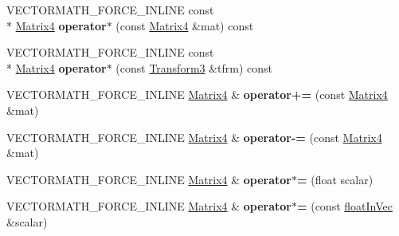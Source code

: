 \begin{DoxyCompactItemize}
\item 
\hypertarget{class_vectormath_1_1_aos_1_1_matrix4_a24d39c34c5cd2ddceef0a2b184d87e52}{V\+E\+C\+T\+O\+R\+M\+A\+T\+H\+\_\+\+F\+O\+R\+C\+E\+\_\+\+I\+N\+L\+I\+N\+E const \\*
\hyperlink{class_vectormath_1_1_aos_1_1_matrix4}{Matrix4} {\bfseries operator$\ast$} (const \hyperlink{class_vectormath_1_1_aos_1_1_matrix4}{Matrix4} \&mat) const }\label{class_vectormath_1_1_aos_1_1_matrix4_a24d39c34c5cd2ddceef0a2b184d87e52}

\item 
\hypertarget{class_vectormath_1_1_aos_1_1_matrix4_ab8bc51436e2519e79a8601b2be8f863e}{V\+E\+C\+T\+O\+R\+M\+A\+T\+H\+\_\+\+F\+O\+R\+C\+E\+\_\+\+I\+N\+L\+I\+N\+E const \\*
\hyperlink{class_vectormath_1_1_aos_1_1_matrix4}{Matrix4} {\bfseries operator$\ast$} (const \hyperlink{class_vectormath_1_1_aos_1_1_transform3}{Transform3} \&tfrm) const }\label{class_vectormath_1_1_aos_1_1_matrix4_ab8bc51436e2519e79a8601b2be8f863e}

\item 
\hypertarget{class_vectormath_1_1_aos_1_1_matrix4_ae838f4db3f02b98435768cc5a4f9b857}{V\+E\+C\+T\+O\+R\+M\+A\+T\+H\+\_\+\+F\+O\+R\+C\+E\+\_\+\+I\+N\+L\+I\+N\+E \hyperlink{class_vectormath_1_1_aos_1_1_matrix4}{Matrix4} \& {\bfseries operator+=} (const \hyperlink{class_vectormath_1_1_aos_1_1_matrix4}{Matrix4} \&mat)}\label{class_vectormath_1_1_aos_1_1_matrix4_ae838f4db3f02b98435768cc5a4f9b857}

\item 
\hypertarget{class_vectormath_1_1_aos_1_1_matrix4_a49551bcb4b568c7716133e30906336bd}{V\+E\+C\+T\+O\+R\+M\+A\+T\+H\+\_\+\+F\+O\+R\+C\+E\+\_\+\+I\+N\+L\+I\+N\+E \hyperlink{class_vectormath_1_1_aos_1_1_matrix4}{Matrix4} \& {\bfseries operator-\/=} (const \hyperlink{class_vectormath_1_1_aos_1_1_matrix4}{Matrix4} \&mat)}\label{class_vectormath_1_1_aos_1_1_matrix4_a49551bcb4b568c7716133e30906336bd}

\item 
\hypertarget{class_vectormath_1_1_aos_1_1_matrix4_a718608f1c2af046b99b6f7d376b9517a}{V\+E\+C\+T\+O\+R\+M\+A\+T\+H\+\_\+\+F\+O\+R\+C\+E\+\_\+\+I\+N\+L\+I\+N\+E \hyperlink{class_vectormath_1_1_aos_1_1_matrix4}{Matrix4} \& {\bfseries operator$\ast$=} (float scalar)}\label{class_vectormath_1_1_aos_1_1_matrix4_a718608f1c2af046b99b6f7d376b9517a}

\item 
\hypertarget{class_vectormath_1_1_aos_1_1_matrix4_a0393f922d365e5b8db3d3bccf6130810}{V\+E\+C\+T\+O\+R\+M\+A\+T\+H\+\_\+\+F\+O\+R\+C\+E\+\_\+\+I\+N\+L\+I\+N\+E \hyperlink{class_vectormath_1_1_aos_1_1_matrix4}{Matrix4} \& {\bfseries operator$\ast$=} (const \hyperlink{class_vectormath_1_1float_in_vec}{float\+In\+Vec} \&scalar)}\label{class_vectormath_1_1_aos_1_1_matrix4_a0393f922d365e5b8db3d3bccf6130810}


\end{DoxyCompactItemize}
